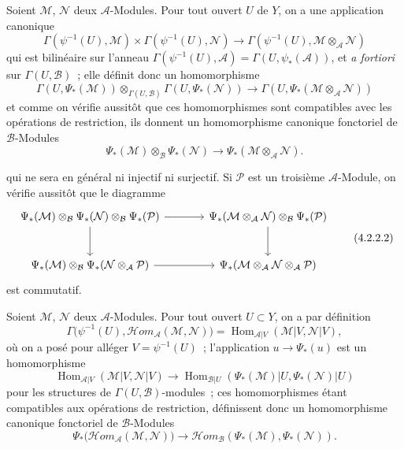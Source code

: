 \begin{env}[4.2.2]
\label{0.4.2.2-fr}
Soient $\mathcal{M}$, $\mathcal{N}$ deux $\mathcal{A}$-Modules. Pour tout
ouvert $U$ de $Y$, on a une application canonique
\[
  \Gamma(\psi^{-1}(U),\mathcal{M})
  \times\Gamma(\psi^{-1}(U),\mathcal{N})
  \longrightarrow
  \Gamma(\psi^{-1}(U),\mathcal{M}\otimes_{\mathcal{A}}\mathcal{N})
\]
qui est bilinéaire sur l'anneau
$\Gamma(\psi^{-1}(U),\mathcal{A})=\Gamma(U,\psi_*(\mathcal{A}))$, et
\emph{a fortiori} sur $\Gamma(U,\mathcal{B})$~; elle définit donc un
homomorphisme
\[
  \Gamma(U,\Psi_*(\mathcal{M}))
  \otimes_{\Gamma(U,\mathcal{B})}
  \Gamma(U,\Psi_*(\mathcal{N}))
  \longrightarrow
  \Gamma(U,\Psi_*(\mathcal{M}\otimes_{\mathcal{A}}\mathcal{N}))
\]
et comme on vérifie aussitôt que ces homomorphismes sont compatibles avec les
opérations de restriction, ils donnent un homomorphisme canonique fonctoriel
de $\mathcal{B}$-Modules
\[
  \Psi_*(\mathcal{M})\otimes_{\mathcal{B}}\Psi_*(\mathcal{N})
  \longrightarrow
  \Psi_*(\mathcal{M}\otimes_{\mathcal{A}}\mathcal{N}).
  \tag{4.2.2.1}\label{0.4.2.2.1-fr}
\]

qui ne sera en général ni injectif ni surjectif. Si $\mathcal{P}$ est un
troisième $\mathcal{A}$-Module, on vérifie aussitôt que le diagramme
\[
\begin{tikzcd}[column sep=large,row sep=large]
\Psi_*(\mathcal{M})\otimes_{\mathcal{B}}\Psi_*(\mathcal{N})
  \otimes_{\mathcal{B}}\Psi_*(\mathcal{P})
  \arrow[r]
  \arrow[d]
&
\Psi_*(\mathcal{M}\otimes_{\mathcal{A}}\mathcal{N})
  \otimes_{\mathcal{B}}\Psi_*(\mathcal{P})
  \arrow[d]
\\
\Psi_*(\mathcal{M})\otimes_{\mathcal{B}}
  \Psi_*(\mathcal{N}\otimes_{\mathcal{A}}\mathcal{P})
  \arrow[r]
&
\Psi_*(\mathcal{M}\otimes_{\mathcal{A}}\mathcal{N}
  \otimes_{\mathcal{A}}\mathcal{P})
\end{tikzcd}
\tag{4.2.2.2}\label{0.4.2.2.2-fr}
\]
est commutatif.
\end{env}

\begin{env}[4.2.3]
\label{0.4.2.3-fr}
Soient $\mathcal{M}$, $\mathcal{N}$ deux $\mathcal{A}$-Modules. Pour tout
ouvert $U\subset Y$, on a par définition
\[
  \Gamma\bigl(\psi^{-1}(U),
    \mathcal{H}\!om_{\mathcal{A}}(\mathcal{M},\mathcal{N})\bigr)
  =
  \operatorname{Hom}_{\mathcal{A}|V}
    (\mathcal{M}|V,\mathcal{N}|V),
\]
où on a posé pour alléger $V=\psi^{-1}(U)$~; l'application
$u\to\Psi_*(u)$ est un homomorphisme
\[
  \operatorname{Hom}_{\mathcal{A}|V}(\mathcal{M}|V,\mathcal{N}|V)
  \longrightarrow
  \operatorname{Hom}_{\mathcal{B}|U}
    (\Psi_*(\mathcal{M})|U,\Psi_*(\mathcal{N})|U)
\]
pour les structures de $\Gamma(U,\mathcal{B})$-modules~; ces homomorphismes
étant compatibles aux opérations de restriction, définissent donc un
homomorphisme canonique fonctoriel de $\mathcal{B}$-Modules
\[
  \Psi_*\bigl(\mathcal{H}\!om_{\mathcal{A}}(\mathcal{M},\mathcal{N})\bigr)
  \longrightarrow
  \mathcal{H}\!om_{\mathcal{B}}
    (\Psi_*(\mathcal{M}),\Psi_*(\mathcal{N})).
  \tag{4.2.3.1}\label{0.4.2.3.1-fr}
\]
\end{env}

